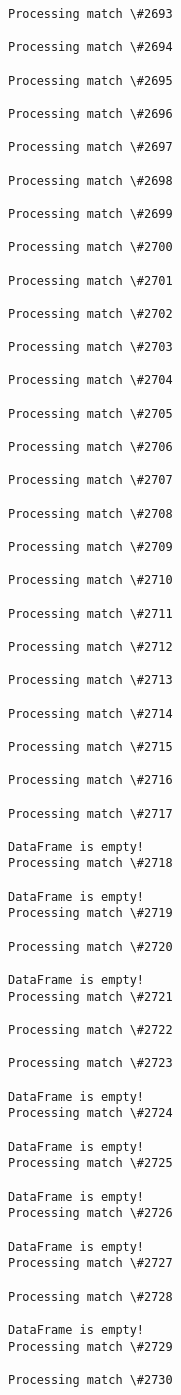 \documentclass[11pt]{article}
\begin{document}
\begin{Verbatim}[commandchars=\\\{\}]
Processing match \#2693

Processing match \#2694

Processing match \#2695

Processing match \#2696

Processing match \#2697

Processing match \#2698

Processing match \#2699

Processing match \#2700

Processing match \#2701

Processing match \#2702

Processing match \#2703

Processing match \#2704

Processing match \#2705

Processing match \#2706

Processing match \#2707

Processing match \#2708

Processing match \#2709

Processing match \#2710

Processing match \#2711

Processing match \#2712

Processing match \#2713

Processing match \#2714

Processing match \#2715

Processing match \#2716

Processing match \#2717

DataFrame is empty!
Processing match \#2718

DataFrame is empty!
Processing match \#2719

Processing match \#2720

DataFrame is empty!
Processing match \#2721

Processing match \#2722

Processing match \#2723

DataFrame is empty!
Processing match \#2724

DataFrame is empty!
Processing match \#2725

DataFrame is empty!
Processing match \#2726

DataFrame is empty!
Processing match \#2727

Processing match \#2728

DataFrame is empty!
Processing match \#2729

Processing match \#2730


\end{Verbatim}
\end{document}
